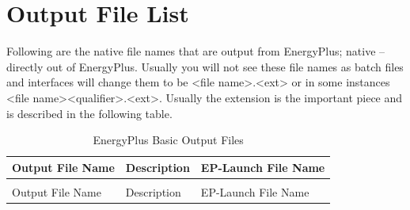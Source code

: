 \section{Output File List}\label{output-file-list}

Following are the native file names that are output from EnergyPlus; native -- directly out of EnergyPlus. Usually you will not see these file names as batch files and interfaces will change them to be \textless{}file name\textgreater{}.\textless{}ext\textgreater{} or in some instances \textless{}file name\textgreater{}\textless{}qualifier\textgreater{}.\textless{}ext\textgreater{}. Usually the extension is the important piece and is described in the following table.

\begin{longtable}[c]{p{1.5in}p{3.0in}p{1.5in}}
\caption{EnergyPlus Basic Output  Files \label{table:energyplus-basic-output-files}} \tabularnewline
\toprule
Output File Name & Description & EP-Launch File Name \tabularnewline
\midrule
\endfirsthead

\caption[]{EnergyPlus Basic Output  Files} \tabularnewline
\toprule
Output File Name & Description & EP-Launch File Name \tabularnewline
\midrule
\endhead


\end{longtable}

